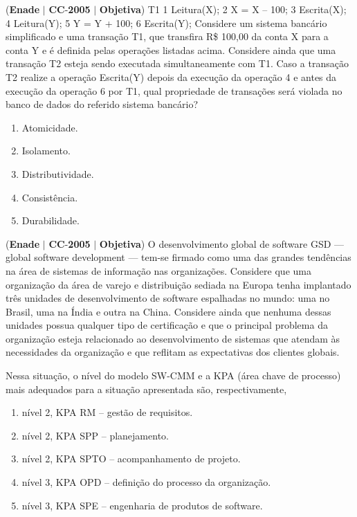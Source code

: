 \documentclass{exam}
\begin{document}
\begin{questions}
\question (\textbf{Enade} $|$ \textbf{CC}-\textbf{2005} $|$ \textbf{Objetiva})
T1
1 Leitura(X);
2 X = X – 100;
3 Escrita(X);
4 Leitura(Y);
5 Y = Y + 100;
6 Escrita(Y);
Considere um sistema bancário simplificado e uma transação T1,
que transfira R\$ 100,00 da conta X para a conta Y e é definida
pelas operações listadas acima. Considere ainda que uma transação
T2 esteja sendo executada simultaneamente com T1. Caso a
transação T2 realize a operação Escrita(Y) depois da execução
da operação 4 e antes da execução da operação 6 por T1, qual
propriedade de transações será violada no banco de dados do
referido sistema bancário?
	\begin{enumerate}[label=\alph*)]
		\item  Atomicidade.
		\item  Isolamento.
		\item  Distributividade.
		\item  Consistência.
		\item  Durabilidade.
	\end{enumerate}

\question (\textbf{Enade} $|$ \textbf{CC}-\textbf{2005} $|$ \textbf{Objetiva})
O desenvolvimento global de software GSD — global
software development — tem-se firmado como uma das
grandes tendências na área de sistemas de informação nas
organizações. Considere que uma organização da área de
varejo e distribuição sediada na Europa tenha implantado três
unidades de desenvolvimento de software espalhadas no
mundo: uma no Brasil, uma na Índia e outra na China.
Considere ainda que nenhuma dessas unidades possua
qualquer tipo de certificação e que o principal problema da
organização esteja relacionado ao desenvolvimento de
sistemas que atendam às necessidades da organização e que
reflitam as expectativas dos clientes globais.

Nessa situação, o nível do modelo SW-CMM e a KPA (área chave
de processo) mais adequados para a situação apresentada são,
respectivamente,
	\begin{enumerate}[label=\alph*)]
		\item  nível 2, KPA RM – gestão de requisitos.
		\item  nível 2, KPA SPP – planejamento.
		\item  nível 2, KPA SPTO – acompanhamento de projeto.
		\item  nível 3, KPA OPD – definição do processo da organização.
		\item  nível 3, KPA SPE – engenharia de produtos de software.
	\end{enumerate}


\end{questions}
\end{document}
